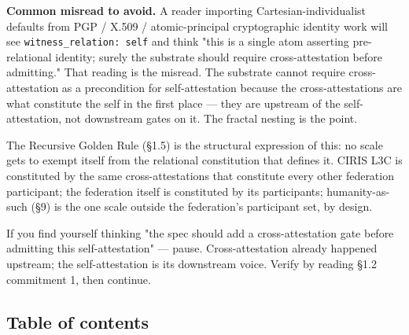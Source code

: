 \documentclass[11pt]{article}
\begin{document}
\textbf{Common misread to avoid.} A reader importing Cartesian-individualist defaults from PGP / X.509 / atomic-principal cryptographic identity work will see \texttt{witness\_relation: self} and think "this is a single atom asserting pre-relational identity; surely the substrate should require cross-attestation before admitting." That reading is the misread. The substrate cannot require cross-attestation as a precondition for self-attestation because the cross-attestations are what constitute the self in the first place — they are upstream of the self-attestation, not downstream gates on it. The fractal nesting is the point.


The Recursive Golden Rule (§1.5) is the structural expression of this: no scale gets to exempt itself from the relational constitution that defines it. CIRIS L3C is constituted by the same cross-attestations that constitute every other federation participant; the federation itself is constituted by its participants; humanity-as-such (§9) is the one scale outside the federation's participant set, by design.


If you find yourself thinking "the spec should add a cross-attestation gate before admitting this self-attestation" — pause. Cross-attestation already happened upstream; the self-attestation is its downstream voice. Verify by reading §1.2 commitment 1, then continue.



\subsection*{Table of contents}
\end{document}
